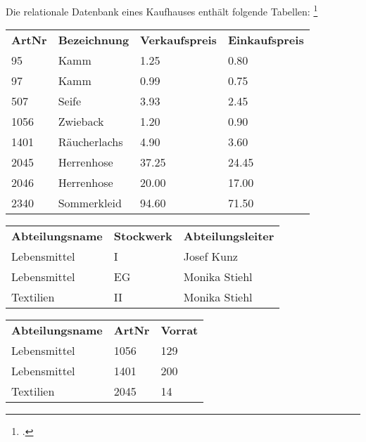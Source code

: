 \documentclass{bschlangaul-aufgabe}
\begin{document}

Die relationale Datenbank eines Kaufhauses enthält folgende Tabellen:
\footcite[Aufgabe 1: Kaufhausdatenbank - einfacher Einstieg]{db:ab:2}


\begin{tabular}{llll}
\textbf{ArtNr} & \textbf{Bezeichnung}  & \textbf{Verkaufspreis} & \textbf{Einkaufspreis} \\
95    & Kamm         & 1.25          & 0.80          \\
97    & Kamm         & 0.99          & 0.75          \\
507   & Seife        & 3.93          & 2.45          \\
1056  & Zwieback     & 1.20          & 0.90          \\
1401  & Räucherlachs & 4.90          & 3.60          \\
2045  & Herrenhose   & 37.25         & 24.45         \\
2046  & Herrenhose   & 20.00         & 17.00         \\
2340  & Sommerkleid  & 94.60         & 71.50
\end{tabular}


\begin{tabular}{lll}
\textbf{Abteilungsname} & \textbf{Stockwerk} & \textbf{Abteilungsleiter} \\
Lebensmittel   & I         & Josef Kunz       \\
Lebensmittel   & EG        & Monika Stiehl    \\
Textilien      & II        & Monika Stiehl
\end{tabular}


\begin{tabular}{lll}
\textbf{Abteilungsname}  & \textbf{ArtNr} & \textbf{Vorrat} \\
Lebensmittel    & 1056  & 129    \\
Lebensmittel    & 1401  & 200    \\
Textilien       & 2045  & 14
\end{tabular}
\end{document}
